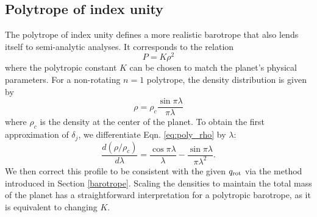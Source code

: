 \subsection{Polytrope of index unity} \label{polytrope}

The polytrope of index unity defines a more realistic barotrope that also lends
itself to semi-analytic analyses. It corresponds to the relation
%
\begin{equation}
    P = K\rho^2
    \label{eq:poly}
\end{equation}
%
where the polytropic constant $K$ can be chosen to match the planet's physical
parameters. For a non-rotating $n=1$ polytrope, the density distribution is given by
%
\begin{equation}
    \rho = \rho_c \frac{\sin \pi \lambda}{\pi \lambda}
    \label{eq:poly_rho}
\end{equation}
%
where $\rho_c$ is the density at the center of the planet.  To obtain the first
approximation of $\delta_j$, we differentiate Eqn. \eqref{eq:poly_rho} by $\lambda$:
%
\begin{equation}
    \frac{d(\rho/\rho_c)}{d\lambda} = \frac{\cos \pi \lambda}{\lambda} 
    - \frac{\sin \pi \lambda}{\pi \lambda^2}.
\end{equation}
%
We then correct this profile to be consistent with the given $q_{\rm rot}$ via the
method introduced in Section \ref{barotrope}. Scaling the densities to maintain the
total mass of the planet has a straightforward interpretation for a polytropic
barotrope, as it is equivalent to changing $K$.

